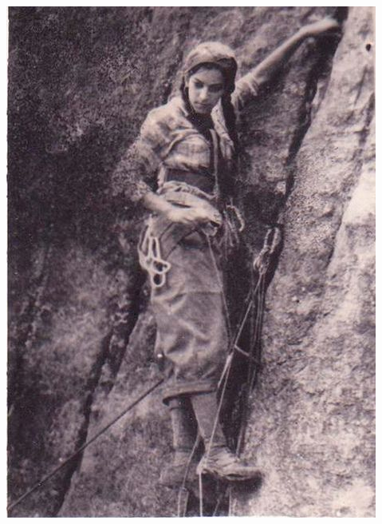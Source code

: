 \begin{multicols}{2}
  \begin{minipage}{\columnwidth}
    \centering
    \includegraphics{figs/oldSchoolCool}
    \vspace{1em}
  \end{minipage}


        \vfill 
\end{multicols}
